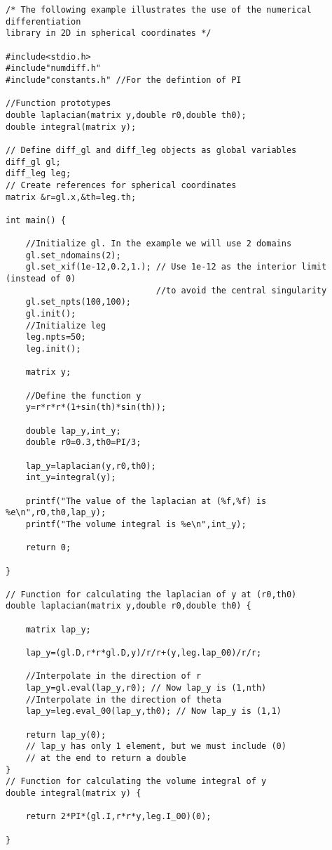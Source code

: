 \begin{verbatim}
/* The following example illustrates the use of the numerical differentiation
library in 2D in spherical coordinates */

#include<stdio.h>
#include"numdiff.h"
#include"constants.h" //For the defintion of PI

//Function prototypes
double laplacian(matrix y,double r0,double th0);
double integral(matrix y);

// Define diff_gl and diff_leg objects as global variables
diff_gl gl; 
diff_leg leg;
// Create references for spherical coordinates
matrix &r=gl.x,&th=leg.th;

int main() {

	//Initialize gl. In the example we will use 2 domains
	gl.set_ndomains(2);
	gl.set_xif(1e-12,0.2,1.); // Use 1e-12 as the interior limit (instead of 0)
							  //to avoid the central singularity
	gl.set_npts(100,100);
	gl.init();
	//Initialize leg
	leg.npts=50;
	leg.init();
	
	matrix y;
	
	//Define the function y
	y=r*r*r*(1+sin(th)*sin(th));
	
	double lap_y,int_y;
	double r0=0.3,th0=PI/3;
	
	lap_y=laplacian(y,r0,th0);
	int_y=integral(y);
	
	printf("The value of the laplacian at (%f,%f) is %e\n",r0,th0,lap_y);
	printf("The volume integral is %e\n",int_y);
	
	return 0;	
	
}

// Function for calculating the laplacian of y at (r0,th0)
double laplacian(matrix y,double r0,double th0) {

	matrix lap_y;
	
	lap_y=(gl.D,r*r*gl.D,y)/r/r+(y,leg.lap_00)/r/r;
	
	//Interpolate in the direction of r
	lap_y=gl.eval(lap_y,r0); // Now lap_y is (1,nth)
	//Interpolate in the direction of theta
	lap_y=leg.eval_00(lap_y,th0); // Now lap_y is (1,1)
	
	return lap_y(0);
	// lap_y has only 1 element, but we must include (0) 
	// at the end to return a double
}
// Function for calculating the volume integral of y
double integral(matrix y) {

	return 2*PI*(gl.I,r*r*y,leg.I_00)(0);

}

\end{verbatim}

